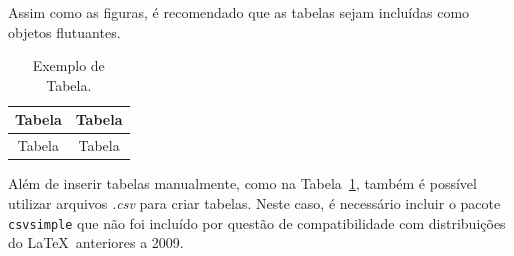 Assim como as figuras, é recomendado que as tabelas sejam incluídas como
objetos flutuantes.
\begin{table}[!htb]
\caption{Exemplo de Tabela.}
\label{tab:exem}
\centering
\begin{tabular}{c|c}
Tabela & Tabela \\ \hline
Tabela & Tabela \\
\end{tabular}
\end{table}

Além de inserir tabelas manualmente, como na Tabela~\ref{tab:exem}, também é
possível utilizar arquivos \emph{.csv} para criar tabelas. Neste caso, é
necessário incluir o pacote \texttt{csvsimple} que não foi incluído por questão
de compatibilidade com distribuições do \LaTeX \ anteriores a 2009.
